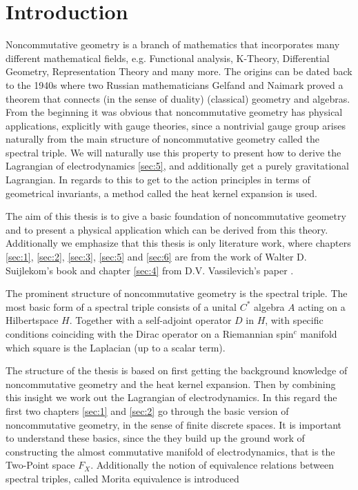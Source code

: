 \section{Introduction}
Noncommutative geometry is a branch of mathematics that incorporates many
different mathematical fields, e.g. Functional analysis, K-Theory,
Differential Geometry, Representation Theory and many more. The origins can
be dated back to the 1940s where two Russian mathematicians Gelfand and
Naimark proved a theorem that connects (in the sense of duality) (classical)
geometry and algebras. From the beginning it was obvious that noncommutative
geometry has physical applications, explicitly with gauge theories, since a
nontrivial gauge group arises naturally from the main structure of
noncommutative geometry called the spectral triple. We will naturally use
this property to present how to derive the Lagrangian of electrodynamics
\ref{sec:5}, and additionally get a purely gravitational Lagrangian.
In regards to this to get to the action principles in terms of geometrical
invariants, a method called the heat kernel expansion is used.

The aim of this thesis is to give a basic foundation of noncommutative
geometry and to present a physical application which can be derived from this
theory. Additionally we emphasize that this thesis is only literature work,
where chapters \ref{sec:1}, \ref{sec:2}, \ref{sec:3}, \ref{sec:5} and \ref{sec:6} are from
the work of Walter D. Suijlekom's book \cite{ncgwalter} and chapter
\ref{sec:4} from D.V. Vassilevich's paper \cite{heatkernel}.

The prominent structure of noncommutative geometry is the spectral triple.
The most basic form of a spectral triple consists of a unital $C^*$ algebra
$A$ acting on a Hilbertspace $H$. Together with a self-adjoint operator $D$ in
$H$, with specific conditions coinciding with the Dirac operator on
a Riemannian spin$^c$ manifold which square is the Laplacian (up to a scalar
term).

The structure of the thesis is based on first getting the background
knowledge of noncommutative geometry and the heat kernel expansion. Then by
combining this insight we work out the Lagrangian of electrodynamics. In this
regard the first two chapters \ref{sec:1} and \ref{sec:2} go through the
basic version of noncommutative geometry, in the sense of finite discrete
spaces. It is important to understand these basics, since the they build up
the ground work of constructing the almost commutative manifold of
electrodynamics, that is the Two-Point space $F_X$. Additionally the notion
of equivalence relations between spectral triples, called Morita equivalence is
introduced

